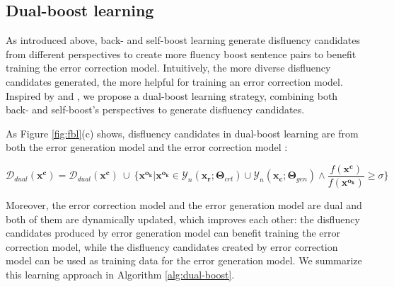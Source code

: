 \documentclass{article} %
\begin{document}
\subsection{Dual-boost learning}\label{subsec:dualboost}

As introduced above, back- and self-boost learning generate disfluency candidates from different perspectives to create more fluency boost sentence pairs to benefit training the error correction model. Intuitively, the more diverse disfluency candidates generated, the more helpful for training an error correction model. Inspired by \cite{he2016dual} and \cite{zhang2018joint}, we propose a dual-boost learning strategy, combining both back- and self-boost's perspectives to generate disfluency candidates. 

As Figure \ref{fig:fbl}(c) shows, disfluency candidates in dual-boost learning are from both the error generation model and the error correction model :

\vspace{-0.4cm}
\begin{equation}\label{eq:dual-boost}
\mathcal{D}_{dual}(\boldsymbol{x^c}) = \mathcal{D}_{dual}(\boldsymbol{x^c}) ~ \cup ~ \{ \boldsymbol{x^{o_k}} | \boldsymbol{x^{o_k}} \in \mathcal{Y}_n(\boldsymbol{x_r};\boldsymbol{\Theta}_{crt}) \cup \mathcal{Y}_n(\boldsymbol{x_c};\boldsymbol{\Theta}_{gen}) \wedge \frac{f(\boldsymbol{x^{c}})}{f(\boldsymbol{x^{o_k}})} \ge \sigma  \}
\end{equation}\vspace{-0.2cm}

Moreover, the error correction model and the error generation model are dual and both of them are dynamically updated, which improves each other: the disfluency candidates produced by error generation model can benefit training the error correction model, while the disfluency candidates created by error correction model can be used as training data for the error generation model. We summarize this learning approach in Algorithm \ref{alg:dual-boost}.
\end{document}
